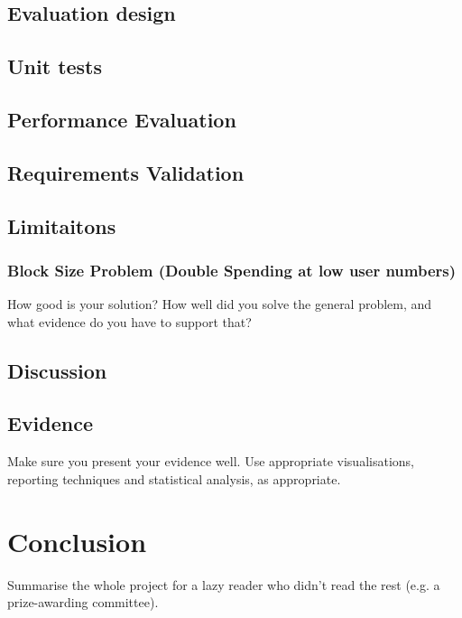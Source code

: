 \documentclass{l4proj}
\begin{document}
\section{Evaluation design}

\section{Unit tests}

\section{Performance Evaluation}

\section{Requirements Validation}

\section{Limitaitons}

\subsection{Block Size Problem (Double Spending at low user numbers)}

How good is your solution? How well did you solve the general problem, and what evidence do you have to support that?
\section{Discussion}


\section{Evidence}
Make sure you present your evidence well. Use appropriate visualisations, reporting techniques and statistical analysis, as appropriate.


\chapter{Conclusion}    
Summarise the whole project for a lazy reader who didn't read the rest (e.g. a prize-awarding committee).
\end{document}
